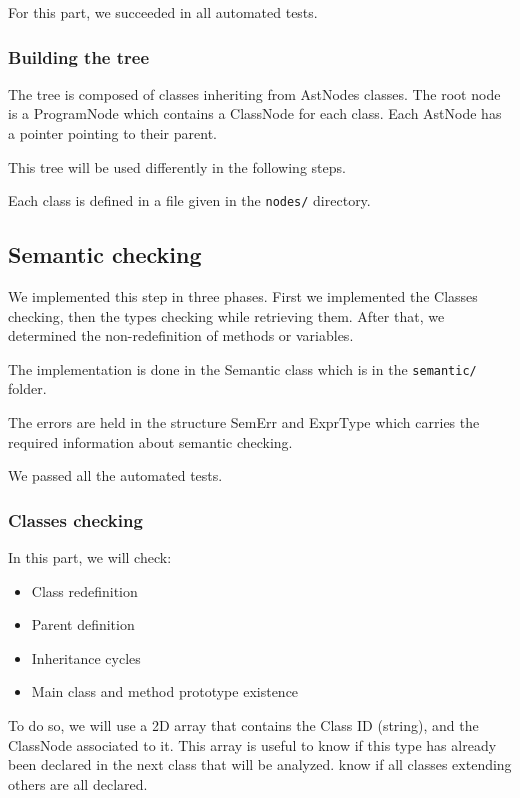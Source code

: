 \documentclass[a4paper,11pt]{article}
\begin{document}
  For this part, we succeeded in all automated tests.

  \subsubsection{Building the tree}
    \label{sec:tree}
    The tree is composed of classes inheriting from AstNodes classes. The root node is a ProgramNode which contains a ClassNode for each class. 
    Each AstNode has a pointer pointing to their parent.

    This tree will be used differently in the following steps.

    Each class is defined in a file given in the \texttt{nodes/} directory.


\subsection{Semantic checking}
  \label{sec:semantic}
  We implemented this step in three phases. 
  First we implemented the Classes checking, then the types checking while retrieving them. After that, we determined the non-redefinition of methods or variables.

  The implementation is done in the Semantic class which is in the \texttt{semantic/} folder.

  The errors are held in the structure SemErr and ExprType which carries the required information about semantic checking.

  We passed all the automated tests.

  \subsubsection{Classes checking}
    In this part, we will check: 
    \begin{itemize}
    \item Class redefinition
    \item Parent definition
    \item Inheritance cycles
    \item Main class and method prototype existence

    \end{itemize}
    To do so, we will use a 2D array that contains the Class ID (string), and the ClassNode associated to it. 
    This array is useful to know if this type has already been declared in the next class that will be analyzed. 
    know if all classes extending others are all declared.
      
\end{document}
